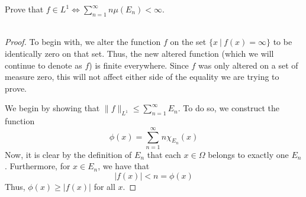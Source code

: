 \documentclass[fontsize=11pt]{scrartcl} %
\numberwithin{equation}{section} %
\numberwithin{figure}{section} %
\numberwithin{table}{section} %
\begin{document}
Prove that $f\in L^1 \iff \sum_{n=1}^{\infty}n\mu(E_n)<\infty$.
\\
\\
\begin{proof}
    To begin with, we alter the function $f$ on the set $\{x\ |\ f(x)=\infty\}$
    to be identically zero on that set. Thus, the new altered function (which we
    will continue to denote as $f$) is finite everywhere. Since $f$ was only
    altered on a set of measure zero, this will not affect either side of the
    equality we are trying to prove.

    We begin by showing that $\|f\|_{L^1}\leq \sum_{n=1}^{\infty}E_n$.
    To do so, we construct the function
    \[
        \phi(x) = \sum_{n=1}^{\infty}n\chi_{E_n}(x)
    \]
    Now, it is clear by the definition of $E_n$ that each $x\in\Omega$ belongs to
    exactly one $E_n$. Furthermore, for $x\in E_n$, we have that
    \[
        |f(x)| < n = \phi(x)
    \]
    Thus, $\phi(x) \geq |f(x)|$ for all $x$.


\end{proof}
\end{document}

